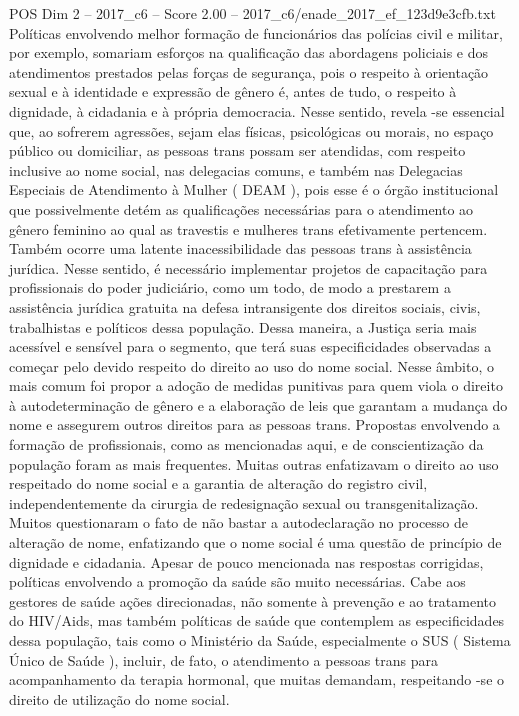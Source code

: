 \begin{textsample}{POS Dim 2 – 2017\_c6 – Score 2.00 – 2017\_c6/enade\_2017\_ef\_123d9e3cfb.txt}
Políticas envolvendo melhor formação de funcionários das polícias civil e militar, por exemplo, somariam esforços na qualificação das abordagens policiais e dos atendimentos prestados pelas forças de segurança, pois o respeito à orientação sexual e à identidade e expressão de gênero é, antes de tudo, o respeito à dignidade, à cidadania e à própria democracia.
Nesse sentido, revela -se essencial que, ao sofrerem agressões, sejam elas físicas, psicológicas ou morais, no espaço público ou domiciliar, as pessoas trans possam ser atendidas, com respeito inclusive ao nome social, nas delegacias comuns, e também nas Delegacias Especiais de Atendimento à Mulher ( DEAM ), pois esse é o órgão institucional que possivelmente detém as qualificações necessárias para o atendimento ao gênero feminino ao qual as travestis e mulheres trans efetivamente pertencem.
Também ocorre uma latente inacessibilidade das pessoas trans à assistência jurídica.
Nesse sentido, é necessário implementar projetos de capacitação para profissionais do poder judiciário, como um todo, de modo a prestarem a assistência jurídica gratuita na defesa intransigente dos direitos sociais, civis, trabalhistas e políticos dessa população.
Dessa maneira, a Justiça seria mais acessível e sensível para o segmento, que terá suas especificidades observadas a começar pelo devido respeito do direito ao uso do nome social.
Nesse âmbito, o mais comum foi propor a adoção de medidas punitivas para quem viola o direito à autodeterminação de gênero e a elaboração de leis que garantam a mudança do nome e assegurem outros direitos para as pessoas trans.
Propostas envolvendo a formação de profissionais, como as mencionadas aqui, e de conscientização da população foram as mais frequentes.
Muitas outras enfatizavam o direito ao uso respeitado do nome social e a garantia de alteração do registro civil, independentemente da cirurgia de redesignação sexual ou transgenitalização.
Muitos questionaram o fato de não bastar a autodeclaração no processo de alteração de nome, enfatizando que o nome social é uma questão de princípio de dignidade e cidadania.
Apesar de pouco mencionada nas respostas corrigidas, políticas envolvendo a promoção da saúde são muito necessárias.
Cabe aos gestores de saúde ações direcionadas, não somente à prevenção e ao tratamento do HIV/Aids, mas também políticas de saúde que contemplem as especificidades dessa população, tais como o Ministério da Saúde, especialmente o SUS ( Sistema Único de Saúde ), incluir, de fato, o atendimento a pessoas trans para acompanhamento da terapia hormonal, que muitas demandam, respeitando -se o direito de utilização do nome social.

\end{textsample}
